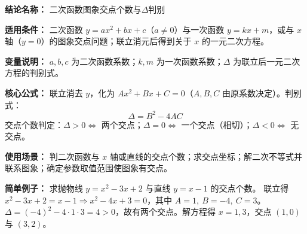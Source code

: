 \textbf{结论名称：} 二次函数图象交点个数与\(\Delta\)判别

\textbf{适用条件：} 二次函数 \(y=ax^2+bx+c\)（\(a\neq0\)）与一次函数 \(y=kx+m\)，或与 \(x\) 轴（\(y=0\)）的图象交点问题；联立消元后得到关于 \(x\) 的一元二次方程。

\textbf{变量说明：} \(a,b,c\) 为二次函数系数；\(k,m\) 为一次函数系数；\(\Delta\) 为联立后一元二次方程的判别式。

\textbf{核心公式：} 联立消去 \(y\)，化为 \(Ax^2+Bx+C=0\)（\(A,B,C\) 由原系数决定）。判别式：
\[
\boxed{\Delta = B^2-4AC}
\]
交点个数判定：\(\Delta>0 \Leftrightarrow\) 两个交点；\(\Delta=0 \Leftrightarrow\) 一个交点（相切）；\(\Delta<0 \Leftrightarrow\) 无交点。

\textbf{使用场景：} 判二次函数与 \(x\) 轴或直线的交点个数；求交点坐标；解二次不等式并联系图象；确定参数取值范围使图象有交点。

\textbf{简单例子：} 求抛物线 \(y=x^2-3x+2\) 与直线 \(y=x-1\) 的交点个数。
联立得 \(x^2-3x+2=x-1 \Rightarrow x^2-4x+3=0\)，其中 \(A=1,\ B=-4,\ C=3\)。
\(\Delta=(-4)^2-4\cdot1\cdot3=4>0\)，故有两个交点。解方程得 \(x=1,3\)，交点 \((1,0)\) 与 \((3,2)\)。